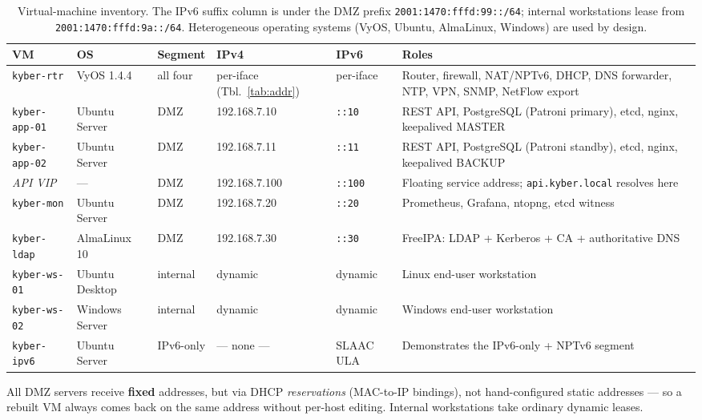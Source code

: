 \documentclass[11pt,a4paper]{article}
\newcommand{\code}[1]{\texttt{#1}}
\begin{document}
\begin{table}[htbp]
\centering
\footnotesize
\setlength{\tabcolsep}{4pt}
\begin{tabularx}{\linewidth}{@{}l l l l l X@{}}
\toprule
\textbf{VM} & \textbf{OS} & \textbf{Segment} & \textbf{IPv4} & \textbf{IPv6} & \textbf{Roles} \\
\midrule
\code{kyber-rtr}    & VyOS 1.4.4    & all four   & per-iface (Tbl.~\ref{tab:addr}) & per-iface & Router, firewall, NAT/NPTv6, DHCP, DNS forwarder, NTP, VPN, SNMP, NetFlow export \\
\code{kyber-app-01} & Ubuntu Server & DMZ        & 192.168.7.10  & \code{::10}  & REST API, PostgreSQL (Patroni primary), etcd, nginx, keepalived MASTER \\
\code{kyber-app-02} & Ubuntu Server & DMZ        & 192.168.7.11  & \code{::11}  & REST API, PostgreSQL (Patroni standby), etcd, nginx, keepalived BACKUP \\
\textit{API VIP}    & ---           & DMZ        & 192.168.7.100 & \code{::100} & Floating service address; \code{api.kyber.local} resolves here \\
\code{kyber-mon}    & Ubuntu Server & DMZ        & 192.168.7.20  & \code{::20}  & Prometheus, Grafana, ntopng, etcd witness \\
\code{kyber-ldap}   & AlmaLinux 10  & DMZ        & 192.168.7.30  & \code{::30}  & FreeIPA: LDAP + Kerberos + CA + authoritative DNS \\
\code{kyber-ws-01}  & Ubuntu Desktop& internal   & dynamic       & dynamic      & Linux end-user workstation \\
\code{kyber-ws-02}  & Windows Server& internal   & dynamic       & dynamic      & Windows end-user workstation \\
\code{kyber-ipv6}   & Ubuntu Server & IPv6-only  & --- none ---  & SLAAC ULA    & Demonstrates the IPv6-only + NPTv6 segment \\
\bottomrule
\end{tabularx}
\caption{Virtual-machine inventory. The IPv6 suffix column is under the DMZ prefix
         \code{2001:1470:fffd:99::/64}; internal workstations lease from
         \code{2001:1470:fffd:9a::/64}. Heterogeneous operating systems (VyOS, Ubuntu,
         AlmaLinux, Windows) are used by design.}
\label{tab:vms}
\end{table}

All DMZ servers receive \textbf{fixed} addresses, but via DHCP \emph{reservations}
(MAC-to-IP bindings), not hand-configured static addresses --- so a rebuilt VM always comes
back on the same address without per-host editing. Internal workstations take ordinary
dynamic leases.
\end{document}
